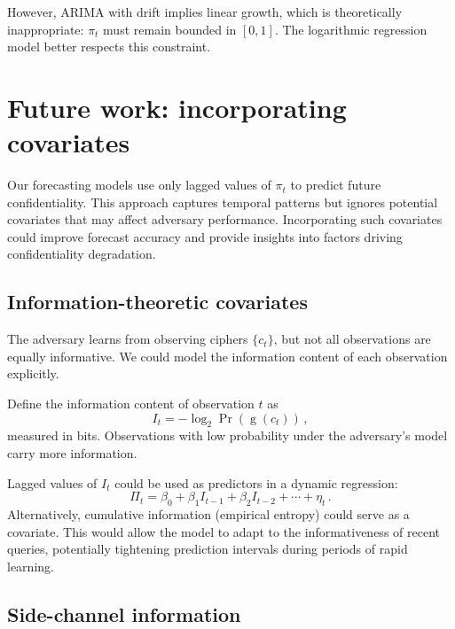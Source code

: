 \documentclass[final,11pt]{article}
\theoremstyle{plain}
\theoremstyle{remark}
\begin{document}
However, ARIMA with drift implies linear growth, which is theoretically
inappropriate: $\pi_t$ must remain bounded in $[0,1]$. The logarithmic
regression model better respects this constraint.

\hypertarget{future-work-dynamic-regression-on-co-variates}{%
\section{Future work: incorporating
covariates}\label{future-work-dynamic-regression-on-co-variates}}

\label{sec:future} Our forecasting models use only lagged values of
$\pi_t$ to predict future confidentiality. This approach captures temporal
patterns but ignores potential covariates that may affect adversary
performance. Incorporating such covariates could improve forecast accuracy
and provide insights into factors driving confidentiality degradation.

\subsection{Information-theoretic covariates}

The adversary learns from observing ciphers $\{c_t\}$, but not all
observations are equally informative. We could model the information
content of each observation explicitly.

Define the information content of observation $t$ as
\begin{equation}
  I_t = -\log_2 \Pr(\operatorname{g}(c_t))\,,
\end{equation}
measured in bits. Observations with low probability under the adversary's
model carry more information.

Lagged values of $I_t$ could be used as predictors in a dynamic regression:
\begin{equation}
  \Pi_t = \beta_0 + \beta_1 I_{t-1} + \beta_2 I_{t-2} + \cdots + \eta_t\,.
\end{equation}
Alternatively, cumulative information (empirical entropy) could serve as
a covariate. This would allow the model to adapt to the informativeness
of recent queries, potentially tightening prediction intervals during
periods of rapid learning.

\subsection{Side-channel information}
\end{document}
